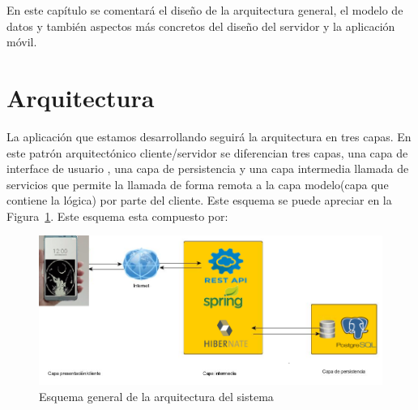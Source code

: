 

En este capítulo se comentará el diseño de la arquitectura general, el
modelo de datos y también aspectos más concretos del diseño del servidor y la aplicación
móvil.



\section{Arquitectura}
La aplicación que estamos desarrollando seguirá la arquitectura
en tres capas. En este patrón arquitectónico cliente/servidor se diferencian tres
capas, una capa de interface de usuario , una capa de persistencia
y una capa intermedia llamada de servicios que permite la llamada de forma remota a la capa modelo(capa que contiene la lógica) por parte del cliente. Este esquema se puede apreciar en la Figura~\ref{fig:arquitectura2}. Este esquema esta compuesto por:




\begin{figure}
		\centering
		\includegraphics[width=\textwidth] {arquitectura2.png}
		\caption{Esquema general de la arquitectura del sistema }\label{fig:arquitectura2}
	\end{figure}


